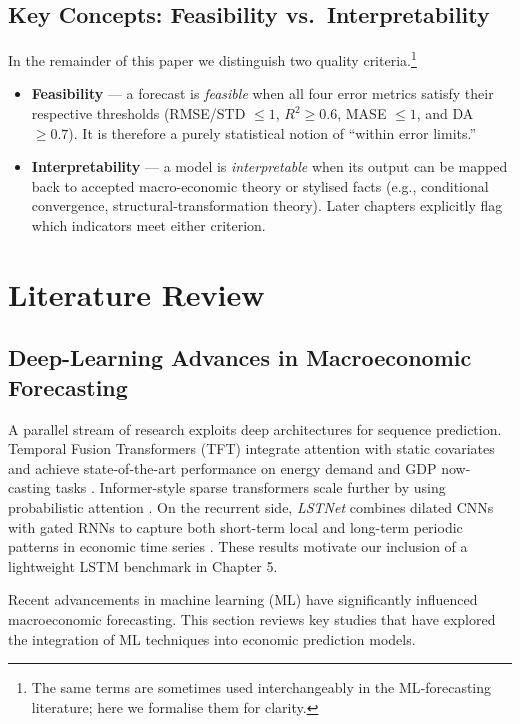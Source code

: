 \documentclass[12pt]{article}
\begin{document}
\subsection{Key Concepts: Feasibility vs.\ Interpretability}
In the remainder of this paper we distinguish two quality criteria.\footnote{The same terms are sometimes used interchangeably in the ML‐forecasting literature; here we formalise them for clarity.}
\begin{itemize}
  \item \textbf{Feasibility} — a forecast is \emph{feasible} when all four error metrics satisfy their respective thresholds (RMSE/STD $\le 1$, $R^2 \ge 0.6$, MASE $\le 1$, and DA $\ge 0.7$).  It is therefore a purely statistical notion of ``within error limits.''
  \item \textbf{Interpretability} — a model is \emph{interpretable} when its output can be mapped back to accepted macro-economic theory or stylised facts (e.g., conditional convergence, structural-transformation theory).  Later chapters explicitly flag which indicators meet either criterion.
\end{itemize}

 
\section{Literature Review}

\subsection{Deep-Learning Advances in Macroeconomic Forecasting}
A parallel stream of research exploits deep architectures for sequence prediction.  
Temporal Fusion Transformers (TFT) integrate attention with static covariates and achieve state-of-the-art performance on energy demand and GDP now-casting tasks \cite{Wen2020TFT}.  
Informer-style sparse transformers scale further by using probabilistic attention \cite{Zhou2021Informer}.  
On the recurrent side, \emph{LSTNet} combines dilated CNNs with gated RNNs to capture both short-term local and long-term periodic patterns in economic time series \cite{Lai2018LSTNet}.  
These results motivate our inclusion of a lightweight LSTM benchmark in Chapter 5.

Recent advancements in machine learning (ML) have significantly influenced macroeconomic forecasting. This section reviews key studies that have explored the integration of ML techniques into economic prediction models.
\end{document}
